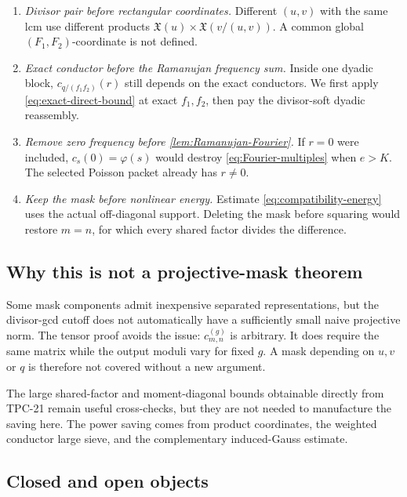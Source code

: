 \begin{enumerate}[label=\textup{(\roman*)}]
 \item \emph{Divisor pair before rectangular coordinates.}
 Different \((u,v)\) with the same lcm use different products
 \(\mathfrak X(u)\times\mathfrak X(v/(u,v))\).  A common global
 \((F_1,F_2)\)-coordinate is not defined.

 \item \emph{Exact conductor before the Ramanujan frequency sum.}
 Inside one dyadic block, \(c_{q/(f_1f_2)}(r)\) still depends on the
 exact conductors.  We first apply \eqref{eq:exact-direct-bound} at
 exact \(f_1,f_2\), then pay the divisor-soft dyadic reassembly.

 \item \emph{Remove zero frequency before
 \cref{lem:Ramanujan-Fourier}.}
 If \(r=0\) were included, \(c_s(0)=\varphi(s)\) would destroy
 \eqref{eq:Fourier-multiples} when \(e>K\).  The selected Poisson packet
 already has \(r\ne0\).

 \item \emph{Keep the mask before nonlinear energy.}
 Estimate \eqref{eq:compatibility-energy} uses the actual off-diagonal
 support.  Deleting the mask before squaring would restore \(m=n\), for
 which every shared factor divides the difference.
\end{enumerate}

\subsection{Why this is not a projective-mask theorem}

Some mask components admit inexpensive separated representations, but
the divisor-gcd cutoff does not automatically have a sufficiently small
naive projective norm.  The tensor proof avoids the issue:
\(c_{m,n}^{(g)}\) is arbitrary.  It does require the same matrix while
the output moduli vary for fixed \(g\).  A mask depending on \(u,v\) or
\(q\) is therefore not covered without a new argument.

The large shared-factor and moment-diagonal bounds obtainable directly
from TPC-21 remain useful cross-checks, but they are not needed to
manufacture the saving here.  The power saving comes from product
coordinates, the weighted conductor large sieve, and the complementary
induced-Gauss estimate.

\subsection{Closed and open objects}

